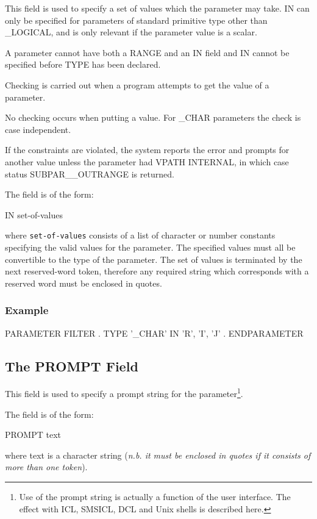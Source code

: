 \documentclass[twoside,11pt,nolof]{starlink}
\begin{document}
This field is used to specify a set of values which the parameter may take.
IN can only be specified for parameters of standard primitive type other
than \_LOGICAL, and is only relevant if the parameter value is a scalar.

A parameter cannot have both a RANGE and an IN field and IN cannot be specified
before TYPE has been declared.

Checking is carried out when a program attempts to get the value of a
parameter.

No checking occurs when putting a value.
For \_CHAR parameters the check is case independent.

If the constraints are violated, the system reports the error and prompts for
another value unless the parameter had VPATH INTERNAL, in which case status
SUBPAR\_\_OUTRANGE is returned.

The field is of the form:
\begin{terminalv}
IN set-of-values
\end{terminalv}
where \texttt{set-of-values} consists of a list of character or number
constants specifying the valid values for the parameter.
The specified values must all be convertible to the type of the parameter.
The set of values is terminated by the next reserved-word token, therefore
any required string which corresponds with a reserved word must be enclosed in
quotes.

\subsubsection*{Example}
\begin{terminalv}
PARAMETER FILTER
      .
   TYPE '_CHAR'
   IN 'R', 'I', 'J'
      .
ENDPARAMETER
\end{terminalv}

\subsection{The PROMPT Field}

This field is used to specify a prompt string for the parameter\footnote{Use
of the prompt string is actually a function of the user interface.
The effect with ICL, SMSICL, DCL and Unix shells is described here.}.

The field is of the form:
\begin{terminalv}
PROMPT  text
\end{terminalv}
where text is a character string (\emph{n.b. it must be enclosed in quotes
if it consists of more than one token}\/).
\end{document}
